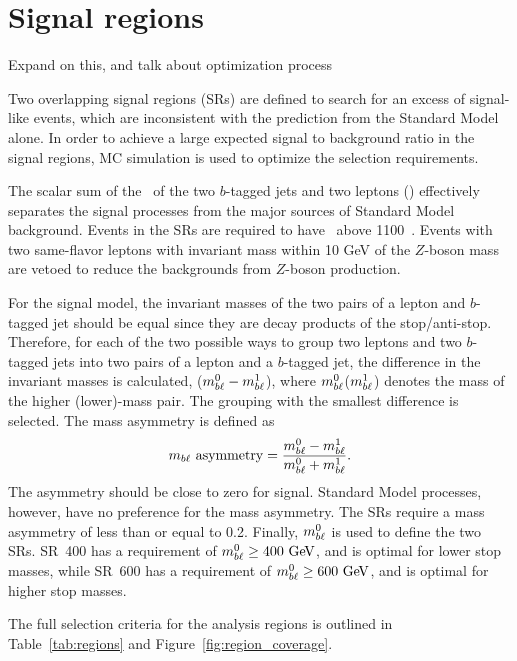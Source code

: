\section{Signal regions}
\label{sec:signal_regions}

{\color{red} Expand on this, and talk about optimization process}

Two overlapping signal regions (SRs) are defined to search for an excess of
signal-like events, which are inconsistent with the prediction from the
Standard Model alone.
In order to achieve a large expected signal to background ratio in the signal
regions, MC simulation is used to optimize the selection requirements.

The scalar sum of the \pt\ of the two $b$-tagged jets and two leptons (\HT) 
effectively separates the signal processes from the major sources of
Standard Model background.
Events in the SRs are required to have \HT\ above 1100~\GeV.
Events with two same-flavor leptons with invariant mass within 10 GeV of the
$Z$-boson mass are vetoed to reduce the backgrounds from $Z$-boson production.

For the signal model, the invariant masses of the two pairs of a lepton and
$b$-tagged jet should be equal since they are decay products of the
stop/anti-stop. Therefore, for each of the two possible ways to group
two leptons and two $b$-tagged jets into two pairs of a lepton and a
$b$-tagged jet, the difference in the invariant masses is calculated,
($m_{b\ell}^0-m_{b\ell}^1$), where $m_{b\ell}^0$($m_{b\ell}^1$) denotes the mass of the
higher (lower)-mass pair. The grouping with the smallest difference
is selected.  The mass asymmetry is defined as
\begin{equation}
  m_{b\ell}~\mathrm{asymmetry} = 
  \frac{m_{b\ell}^0-m_{b\ell}^1}{m_{b\ell}^0+m_{b\ell}^1}.
\end{equation}
The asymmetry should be
close to zero for signal.  Standard Model processes, however, have no
preference for the mass asymmetry.  The SRs require a mass
asymmetry of less than or equal to 0.2.
Finally, $m_{b\ell}^0$ is used to define the two SRs.
SR~400 has a requirement of $\MBL^0 \geq 400 \GeV$, and is optimal for lower
stop masses, while SR~600 has a requirement of $\MBL^0 \geq 600 \GeV$, and is
optimal for higher stop masses.

The full selection criteria for the analysis regions is outlined in
Table~\ref{tab:regions} and Figure~\ref{fig:region_coverage}.

